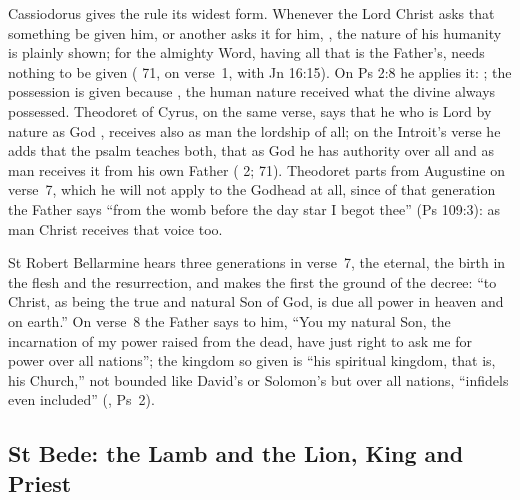 Cassiodorus gives the rule its widest form. Whenever the Lord Christ asks that
something be given him, or another asks it for him, , the nature of his humanity is plainly shown; for the
almighty Word, having all that is the Father's, needs nothing to be given
( 71, on verse~1, with Jn 16:15). On Ps 2:8 he applies
it: ; the possession is given because , the human nature received
what the divine always possessed. Theodoret of Cyrus, on the same verse, says
that he who is Lord by nature as God , receives also as man the lordship of all; on the Introit's verse he
adds that the psalm teaches both, that as God he has authority over all and as
man receives it from his own Father ( 2; 71).
Theodoret parts from Augustine on verse~7, which he will not apply to the
Godhead at all, since of that generation the Father says ``from the womb before
the day star I begot thee'' (Ps 109:3): as man Christ receives that voice too.

St Robert Bellarmine hears three generations in verse~7, the eternal, the
birth in the flesh and the resurrection, and makes the first the ground of the
decree: ``to Christ, as being the true and natural Son of God, is due all
power in heaven and on earth.'' On verse~8 the Father says to him, ``You my
natural Son, the incarnation of my power raised from the dead, have just right
to ask me for power over all nations''; the kingdom so given is ``his spiritual
kingdom, that is, his Church,'' not bounded like David's or Solomon's but over
all nations, ``infidels even included'' (, Ps~2).

\subsection{St Bede: the Lamb and the Lion, King and Priest}
\label{sec:lamb-bede}

